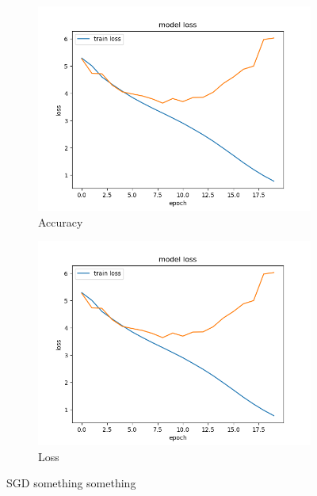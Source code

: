 

\begin{figure}[!h]
\begin{subfigure}{.5\textwidth}
  \centering
  \includegraphics[width=1.1\linewidth]{../../src/loss_plots/sgd.png}
  \caption{Accuracy}
  \label{fig:sfig1}
\end{subfigure}%
\begin{subfigure}{.5\textwidth}
  \centering
  \includegraphics[width=1.1\linewidth]{../../src/loss_plots/sgd.png}
  \caption{Loss}
  \label{fig:sfig2}
\end{subfigure}
\caption{SGD something something}
\label{fig:fig}
\end{figure}

\FloatBarrier
